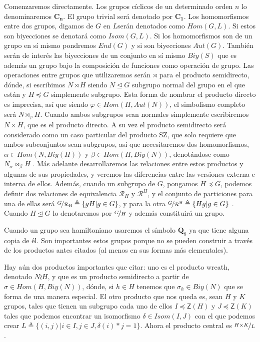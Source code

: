 \documentclass[12pt,a4paper,fleqn,spanish,final,openright]{extbook}
\theoremstyle{definition}
\theoremstyle{remark}
\begin{document}
Comenzaremos directamente. Los grupos cíclicos de un determinado orden
$n$ lo denominaremos $\mathbf{C_{n}}$. El grupo trivial será denotado
por $\mathbf{C_1}$. Los homomorfismos entre dos grupos, digamos
de $G$ en $L$serán denotados como $Hom(G,L)$. Si estos son biyecciones
se denotará como $Isom(G,L)$. Si los homomorfismos son de un grupo
en sí mismo pondremos $End(G)$ y si son biyecciones $Aut(G)$. También
serán de interés las biyecciones de un conjunto en sí mismo $Biy(S)$
que es además un grupo bajo la composición de funciones como operación
de grupo. Las operaciones entre grupos que utilizaremos serán $\rtimes$
para el producto semidirecto, dónde, si escribimos $N\rtimes H$ siendo
$N \trianglelefteq G$ subgrupo normal del grupo en el que están y
$H    \preccurlyeq    G$ simplemente subgrupo. Esta forma de nombrar el
producto directo es imprecisa, así que siendo $\varphi    \in Hom(H,Aut(N))$,
el simbolismo completo será $N\rtimes_{\varphi }H$. Cuando ambos subgrupos
sean normales simplemente escribiremos $N   \times     H$, que es el producto
directo. A su vez el producto semidirecto será considerado como un
caso particular del producto SZ, que solo requiere que ambos subconjuntos
sean subgrupos, así que necesitaremos dos homomorfismos, $\alpha    \in Hom(N,Biy(H))$
y $\beta    \in Hom(H,Biy(N))$, denotándose como $N_{\alpha \!}\bowtie_{\beta }H$
. Más adelante desarrollaremos las relaciones entre estos productos
y algunas de sus propiedades, y veremos las diferencias entre las
versiones externa e interna de ellos. Además, cuando un subgrupo de
$G$, pongamos $H    \preccurlyeq    G$, podemos definir dos relaciones
de equivalencia $\mathcal{R}_{H}$ y $\mathcal{R}^{H}$, y el conjunto
de particiones para una de ellas será $\nicefrac{G}{{\mathcal{R}}_{\mathrm{H}}}
\triangleq\lbrace gH \vert g   \in G\rbrace$,
y para la otra
$\nicefrac{G}{{\mathcal{R}}^{\mathrm{H}}}\triangleq\lbrace Hg|g   \in G\rbrace$
. Cuando $H\trianglelefteq G$ lo denotaremos por $\nicefrac{G}{H}$
y además constituirá un grupo.

Cuando un grupo sea hamiltoniano usaremos el símbolo $\boldsymbol{Q}_{8}$ ya
que tiene alguna copia de él. Son importantes estos grupos porque
no se pueden construir a través de los productos antes citados (al menos en
sus formas más elementales).

Hay aún dos productos importantes que citar: uno es el producto wreath,
denotado $N\wr H$, y que es un producto semidirecto a partir de
$\sigma    \in Hom(H,Biy(N))$, dónde, si $h    \in H$ tenemos que $\sigma_{h}    \in Biy(N)$
que se forma de una manera especial. El otro producto que nos queda
es, sean $H$ y $K$ grupos, tales que tienen un subgrupo cada uno
de ellos $I    \preccurlyeq    \mathsf{Z}(H)$ y $J    \preccurlyeq    \mathsf{Z}(K)$
tales que podemos encontrar un isomorfismo $\delta    \in Isom(I,J)$
con el que podemos crear $L\triangleq\lbrace(i,j) \vert i   \in I,j   \in J,\delta (i)*j=1\rbrace$.
Ahora el producto central es $\nicefrac{H   \times    K}{L}$.
\end{document}
